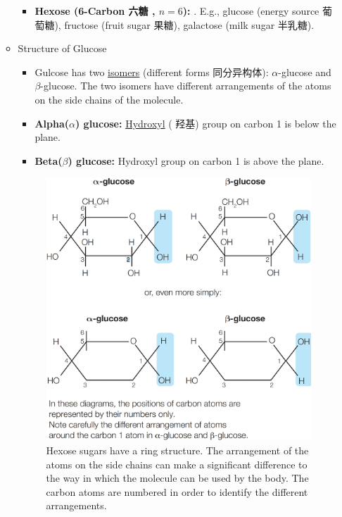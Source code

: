 \begin{itemize}
\begin{itemize}
\begin{itemize}
            \item \textbf{Hexose (6-Carbon 六糖 , $n=6$):} . E.g., glucose (energy source 葡萄糖), fructose (fruit
            sugar 果糖), galactose (milk sugar 半乳糖).
        \end{itemize}
        \item Structure of Glucose
        \begin{itemize}
            \item Gulcose has two \underline{isomers} (different forms 同分异构体): $\alpha$-glucose and $\beta$-glucose. The two
            isomers have different arrangements of the atoms on the side chains of the molecule.
            \item \textbf{Alpha($\alpha$) glucose:} \underline{Hydroxyl} ( 羟基) group on carbon 1 is below the plane.
            \item \textbf{Beta($\beta$) glucose:} Hydroxyl group on carbon 1 is above the plane.
        \end{itemize}
        \begin{figure}[H]
            \centering
            \includegraphics[scale=0.155]{Biology/1A/Images/1A-2-3.png}
            \caption{Hexose sugars have a ring structure. The arrangement of the atoms on the side chains can make a significant
            difference to the way in which the molecule can be used by the body. The carbon atoms are numbered in order to
            identify the different arrangements.}
        \end{figure}
    \end{itemize}
\end{itemize}

